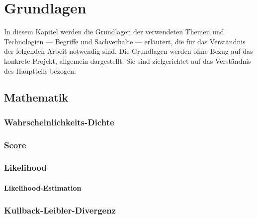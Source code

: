 \chapter{Grundlagen}

In diesem Kapitel werden die Grundlagen der verwendeten Themen und Technologien --- Begriffe und Sachverhalte --- erläutert, die für das Verständnis der folgenden Arbeit notwendig sind.
Die Grundlagen werden ohne Bezug auf das konkrete Projekt, allgemein dargestellt. Sie sind zielgerichtet auf das Verständnis des Hauptteils bezogen.



\section{Mathematik}

\subsection{Wahrscheinlichkeits-Dichte}

\subsection{Score}

\subsection{Likelihood}

\subsubsection{Likelihood-Estimation}

\subsection{Kullback-Leibler-Divergenz}



